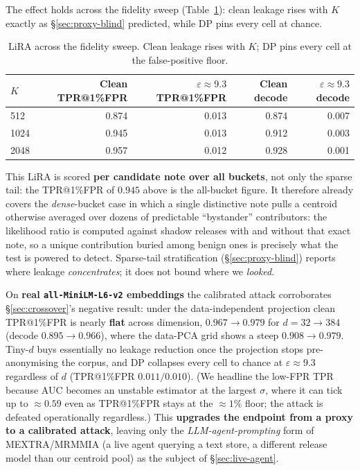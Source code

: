 \documentclass[pdflatex,sn-mathphys-num,12pt]{sn-jnl}
\theoremstyle{thmstyleone}%
\theoremstyle{thmstyletwo}%
\theoremstyle{thmstylethree}%
\newcommand{\eps}{\varepsilon}
\newcommand{\secref}[1]{\S\ref{#1}}
\begin{document}
The effect holds across the fidelity sweep (Table~\ref{tab:lira-sweep}): clean leakage rises
with $K$ exactly as \secref{sec:proxy-blind} predicted, while DP pins every cell at chance.

\begin{table}[t]
  \centering
  \caption{LiRA across the fidelity sweep. Clean leakage rises with $K$; DP pins every cell
  at the false-positive floor.}
  \label{tab:lira-sweep}
  \footnotesize
  \begin{tabular}{@{}lrrrr@{}}
    \toprule
    $K$ & Clean TPR@1\%FPR & $\eps \approx 9.3$ TPR@1\%FPR & Clean decode & $\eps \approx 9.3$ decode \\
    \midrule
    512  & 0.874 & 0.013 & 0.874 & 0.007 \\
    1024 & 0.945 & 0.013 & 0.912 & 0.003 \\
    2048 & 0.957 & 0.012 & 0.928 & 0.001 \\
    \bottomrule
  \end{tabular}
\end{table}

This LiRA is scored \textbf{per candidate note over all buckets}, not only the sparse tail:
the TPR@1\%FPR of $0.945$ above is the all-bucket figure. It therefore already covers the
\emph{dense}-bucket case in which a single distinctive note pulls a centroid otherwise averaged
over dozens of predictable ``bystander'' contributors: the likelihood ratio is computed
against shadow releases with and without that exact note, so a unique contribution buried among
benign ones is precisely what the test is powered to detect. Sparse-tail stratification
(\secref{sec:proxy-blind}) reports where leakage \emph{concentrates}; it does not bound where
we \emph{looked}.

On \textbf{real \texttt{all-MiniLM-L6-v2} embeddings} the calibrated attack corroborates
\secref{sec:crossover}'s negative result: under the data-independent projection clean
TPR@1\%FPR is nearly \textbf{flat} across dimension, $0.967 \to 0.979$ for $d = 32 \to 384$
(decode $0.895 \to 0.966$), where the data-PCA grid shows a steep
$0.908 \to 0.979$. Tiny-$d$ buys essentially no leakage reduction once the projection stops
pre-anonymising the corpus, and DP collapses every cell to chance at $\eps \approx 9.3$
regardless of $d$ (TPR@1\%FPR $0.011 / 0.010$). (We headline the low-FPR TPR because AUC
becomes an unstable estimator at the largest $\sigma$, where it can tick up to $\approx 0.59$
even as TPR@1\%FPR stays at the ${\approx}1\%$ floor; the attack is defeated operationally
regardless.) This \textbf{upgrades the endpoint from a proxy to a calibrated attack}, leaving
only the \emph{LLM-agent-prompting} form of MEXTRA/MRMMIA (a live agent querying a text
store, a different release model than our centroid pool) as the subject of
\secref{sec:live-agent}.
\end{document}
